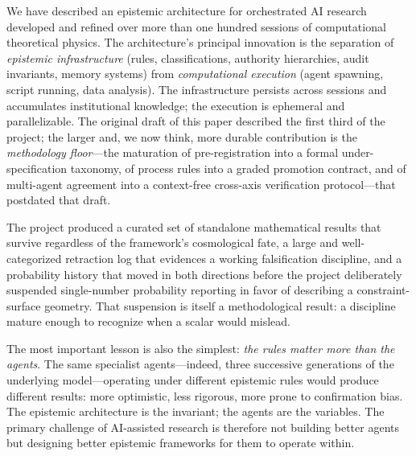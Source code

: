 \documentclass[12pt,a4paper]{article}
\begin{document}
We have described an epistemic architecture for orchestrated AI research developed and refined over more than one hundred sessions of computational theoretical physics. The architecture's principal innovation is the separation of \emph{epistemic infrastructure} (rules, classifications, authority hierarchies, audit invariants, memory systems) from \emph{computational execution} (agent spawning, script running, data analysis). The infrastructure persists across sessions and accumulates institutional knowledge; the execution is ephemeral and parallelizable. The original draft of this paper described the first third of the project; the larger and, we now think, more durable contribution is the \emph{methodology floor}---the maturation of pre-registration into a formal under-specification taxonomy, of process rules into a graded promotion contract, and of multi-agent agreement into a context-free cross-axis verification protocol---that postdated that draft.

The project produced a curated set of standalone mathematical results that survive regardless of the framework's cosmological fate, a large and well-categorized retraction log that evidences a working falsification discipline, and a probability history that moved in both directions before the project deliberately suspended single-number probability reporting in favor of describing a constraint-surface geometry. That suspension is itself a methodological result: a discipline mature enough to recognize when a scalar would mislead.

The most important lesson is also the simplest: \emph{the rules matter more than the agents}. The same specialist agents---indeed, three successive generations of the underlying model---operating under different epistemic rules would produce different results: more optimistic, less rigorous, more prone to confirmation bias. The epistemic architecture is the invariant; the agents are the variables. The primary challenge of AI-assisted research is therefore not building better agents but designing better epistemic frameworks for them to operate within.


\end{document}

